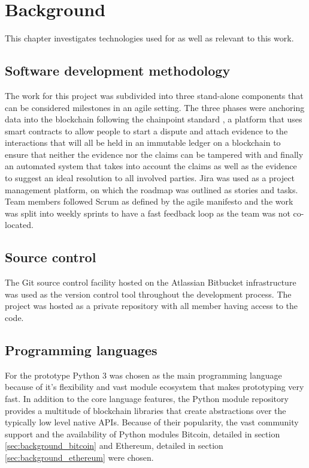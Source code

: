 \documentclass[12pt,msc,a4paper,oneside]{ucl_thesis}
\begin{document}
\section{Background} \label{sec:background}
This chapter investigates technologies used for as well as relevant to this work.

\subsection{Software development methodology}
The work for this project was subdivided into three stand-alone components that can be considered milestones in an agile setting. The three phases were anchoring data into the blockchain following the chainpoint standard \cite{chainpoint:vaughan}, a platform that uses smart contracts to allow people to start a dispute and attach evidence to the interactions that will all be held in an immutable ledger on a blockchain to ensure that neither the evidence nor the claims can be tampered with and finally an automated system that takes into account the claims as well as the evidence to suggest an ideal resolution to all involved parties. %
Jira was used as a project management platform, on which the roadmap was outlined as stories and tasks. Team members followed Scrum as defined by the agile manifesto and the work was split into weekly sprints to have a fast feedback loop as the team was not co-located.

\subsection{Source control}
The Git source control facility hosted on the Atlassian Bitbucket infrastructure was used as the version control tool throughout the development process. The project was hosted as a private repository with all member having access to the code.

\subsection{Programming languages}
For the prototype Python 3 was chosen as the main programming language because of it's flexibility and vast module ecosystem that makes prototyping very fast. In addition to the core language features, the Python module repository provides a multitude of blockchain libraries that create abstractions over the typically low level native APIs. Because of their popularity, the vast community support and the availability of Python modules Bitcoin, detailed in section \ref{sec:background_bitcoin} and Ethereum, detailed in section \ref{sec:background_ethereum} were chosen.
\end{document}

